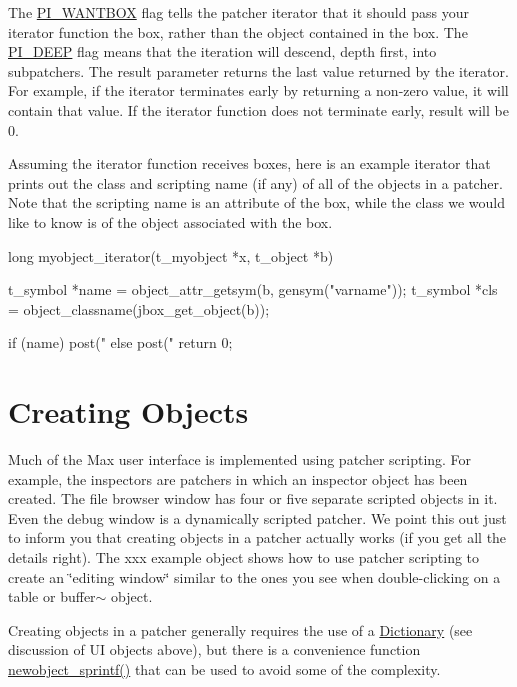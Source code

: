 The \hyperlink{group__patcher_ggabc6126af1d45847bc59afa0aa3216b04a128de369dd62c2625aff042d820456eb}{PI\_\-WANTBOX} flag tells the patcher iterator that it should pass your iterator function the box, rather than the object contained in the box. The \hyperlink{group__patcher_ggabc6126af1d45847bc59afa0aa3216b04a615ccc19640c4714e619315b94765e48}{PI\_\-DEEP} flag means that the iteration will descend, depth first, into subpatchers. The result parameter returns the last value returned by the iterator. For example, if the iterator terminates early by returning a non-\/zero value, it will contain that value. If the iterator function does not terminate early, result will be 0.

Assuming the iterator function receives boxes, here is an example iterator that prints out the class and scripting name (if any) of all of the objects in a patcher. Note that the scripting name is an attribute of the box, while the class we would like to know is of the object associated with the box.


\begin{DoxyCode}
    long myobject_iterator(t_myobject *x, t_object *b)
    {
        t_symbol *name = object_attr_getsym(b, gensym("varname"));
        t_symbol *cls = object_classname(jbox_get_object(b));

        if (name)
            post("%
        else
            post("%
        return 0;
    }
\end{DoxyCode}
\hypertarget{chapter_scripting_chapter_scripting_objects}{}\section{Creating Objects}\label{chapter_scripting_chapter_scripting_objects}
Much of the Max user interface is implemented using patcher scripting. For example, the inspectors are patchers in which an inspector object has been created. The file browser window has four or five separate scripted objects in it. Even the debug window is a dynamically scripted patcher. We point this out just to inform you that creating objects in a patcher actually works (if you get all the details right). The xxx example object shows how to use patcher scripting to create an \char`\"{}editing window\char`\"{} similar to the ones you see when double-\/clicking on a table or buffer$\sim$ object.

Creating objects in a patcher generally requires the use of a \hyperlink{group__dictionary}{Dictionary} (see discussion of UI objects above), but there is a convenience function \hyperlink{group__obj_gad81c665a20c3c707decaf3403468ff47}{newobject\_\-sprintf()} that can be used to avoid some of the complexity.

